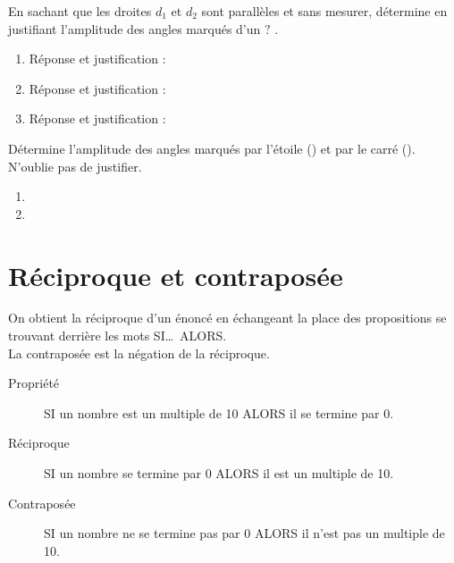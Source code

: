 \documentclass[../../syllabus_2.tex]{subfiles}
\begin{document}
\begin{exercise}
    En sachant que les droites $d_1$ et $d_2$ sont parallèles et sans mesurer, détermine en justifiant l'amplitude des angles marqués d'un \og $?$ \fg.
    \begin{enumerate}[itemsep=3cm]
        \item \makebox[.5\linewidth]{} Réponse et justification :
        \item \makebox[.5\linewidth]{} Réponse et justification :
        \item \makebox[.5\linewidth]{} Réponse et justification :
    \end{enumerate}
\end{exercise}

\newpage
\begin{exercise}
    Détermine l'amplitude des angles marqués par l'étoile () et par le carré (). N'oublie pas de justifier.
    \begin{enumerate}[cols=2]
        \item
              \vfill
        \item
              
    \end{enumerate}
    \vspace*{7cm}
\end{exercise}

\newpage
\section{Réciproque et contraposée}
On obtient la réciproque d'un énoncé en échangeant la place des propositions se trouvant derrière les mots SI\dots\ ALORS.\\
La contraposée est la négation de la réciproque.

\exemple
\begin{description}
    \item[Propriété] SI un nombre est un multiple de 10 ALORS il se termine par 0.
    \item[Réciproque] SI un nombre se termine par 0 ALORS  il est un multiple de 10.
    \item[Contraposée] SI un nombre ne se termine pas par 0 ALORS il n'est pas un multiple de 10.
\end{description}
\end{document}

